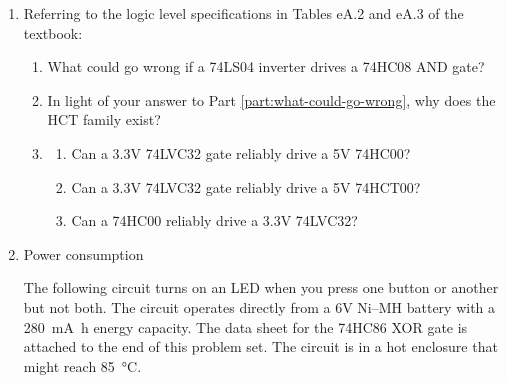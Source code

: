 \documentclass{e85}
\begin{document}
\begin{enumerate}
\item Referring to the logic level specifications in Tables eA.2 and
  eA.3 of the textbook:
  \begin{enumerate}
  \item \label{part:what-could-go-wrong} What could go wrong if a
    74LS04 inverter drives a 74HC08 AND gate?
    \begin{solution}
    \end{solution}
  \item In light of your answer to Part
    \ref{part:what-could-go-wrong}, why does the HCT family exist?
    \begin{solution}
    \end{solution}
  \item
    \begin{enumerate}
    \item Can a 3.3V 74LVC32 gate reliably drive a 5V 74HC00?
      \begin{solution}
      \end{solution}
    \item Can a 3.3V 74LVC32 gate reliably drive a 5V 74HCT00?
      \begin{solution}
      \end{solution}
    \item Can a 74HC00 reliably drive a 3.3V 74LVC32?
      \begin{solution}
      \end{solution}
    \end{enumerate}
  \end{enumerate}

\item Power consumption

  The following circuit turns on an LED when you press one button or
  another but not both.  The circuit operates directly from a 6V
  Ni--MH battery with a \SI{280}{\mA\hour} energy capacity.  The data
  sheet for the 74HC86 XOR gate is attached to the end of this problem
  set.  The circuit is in a hot enclosure that might reach
  \SI{85}{\celsius}.
  \begin{center}
\end{center}
\end{enumerate}
\end{document}
